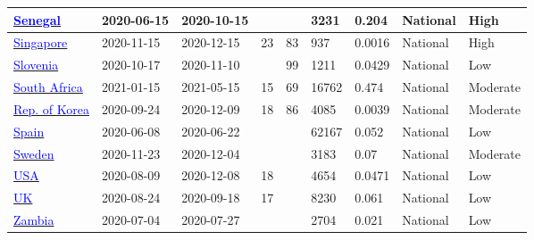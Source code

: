 \begin{table}[!ht]
\begin{center}
\begin{tabular}{p{2cm} | p{1.6cm} | p{1.6cm} | p{0.8cm} | p{0.8cm} | p{1cm} | p{1.3cm} | p{1.2cm} | p{1.2cm}}
\hline 
\href{https://www.ncbi.nlm.nih.gov/pmc/articles/PMC8702669/}{\textcolor{blue}{Senegal}} & 2020-06-15 & 2020-10-15 &  &  & 3231 & 0.204 & National & High \\ 
\hline 
\href{https://papers.ssrn.com/sol3/papers.cfm?abstract\_id=3826194}{\textcolor{blue}{Singapore}} & 2020-11-15 & 2020-12-15 & 23 & 83 & 937 & 0.0016 & National & High \\ 
\hline 
\href{https://dx.doi.org/10.1016/j.cmi.2021.03.009}{\textcolor{blue}{Slovenia}} & 2020-10-17 & 2020-11-10 &  & 99 & 1211 & 0.0429 & National & Low \\ 
\hline 
\href{https://assets.researchsquare.com/files/rs-690372/v2\_covered.pdf?c=1627923426}{\textcolor{blue}{South Africa}} & 2021-01-15 & 2021-05-15 & 15 & 69 & 16762 & 0.474 & National & Moderate \\ 
\hline 
\href{https://bmjopen.bmj.com/content/11/4/e049837.abstract}{\textcolor{blue}{Rep. of Korea}} & 2020-09-24 & 2020-12-09 & 18 & 86 & 4085 & 0.0039 & National & Moderate \\ 
\hline 
\href{https://www.mscbs.gob.es/ciudadanos/ene-covid/docs/ESTUDIO\_ENE-COVID19\_INFORME\_FINAL.pdf}{\textcolor{blue}{Spain}} & 2020-06-08 & 2020-06-22 &  &  & 62167 & 0.052 & National & Low \\ 
\hline 
\href{https://www.folkhalsomyndigheten.se/contentassets/376f9021a4c84da08de18ac597284f0c/pavisning-antikroppar-genomgangen-covid-19-blodgivare-delrapport-2.pdf}{\textcolor{blue}{Sweden}} & 2020-11-23 & 2020-12-04 &  &  & 3183 & 0.07 & National & Moderate \\ 
\hline 
\href{https://dx.doi.org/10.1093/cid/ciab626}{\textcolor{blue}{USA}} & 2020-08-09 & 2020-12-08 & 18 &  & 4654 & 0.0471 & National & Low \\ 
\hline 
\href{https://www.gov.uk/government/publications/national-covid-19-surveillance-reports}{\textcolor{blue}{UK}} & 2020-08-24 & 2020-09-18 & 17 &  & 8230 & 0.061 & National & Low \\ 
\hline 
\href{https://www.thelancet.com/journals/langlo/article/PIIS2214-109X(21)00053-X/fulltext}{\textcolor{blue}{Zambia}} & 2020-07-04 & 2020-07-27 &  &  & 2704 & 0.021 & National & Low \\ 
\hline 

    \end{tabular}
    \end{center}
\end{table}